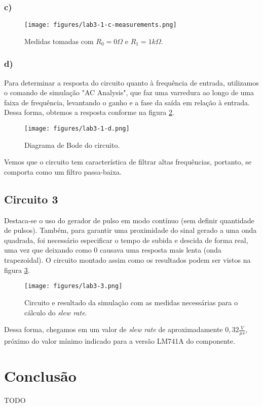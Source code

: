 \documentclass[a4paper]{report}
\begin{document}
\subsubsection*{c)}

\begin{figure}[H]
    \centering
    \texttt{[image: figures/lab3-1-c-measurements.png]}
    \caption{Medidas tomadas com $R_0=0 \Omega$ e $R_1 = 1 k\Omega$.}
    \label{fig:figures-lab3-1-a-measurements-png}
\end{figure}

\subsubsection*{d)}

Para determinar a resposta do circuito quanto à frequência de entrada, utilizamos o comando de simulação "AC Analysis", que faz uma varredura ao longo de uma faixa de frequência, levantando o ganho e a fase da saída em relação à entrada. Dessa forma, obtemos a resposta conforme na figura \ref{fig:figures-lab3-1-a-measurements-png}.

\begin{figure}[H]
    \centering
    \texttt{[image: figures/lab3-1-d.png]}
    \caption{Diagrama de Bode do circuito.}
    \label{fig:figures-lab3-1-a-measurements-png}
\end{figure}

Vemos que o circuito tem característica de filtrar altas frequências, portanto, se comporta como um filtro passa-baixa.

\subsection*{Circuito 3}

Destaca-se o uso do gerador de pulso em modo contínuo (sem definir quantidade de pulsos). Também, para garantir uma proximidade do sinal gerado a uma onda quadrada, foi necessário especificar o tempo de subida e descida de forma real, uma vez que deixando como 0 causava uma resposta mais lenta (onda trapezoidal). O circuito montado assim como os resultados podem ser vistos na figura \ref{fig:figures-lab3-3-png}.

\begin{figure}[H]
    \centering
    \texttt{[image: figures/lab3-3.png]}
    \caption{Circuito e resultado da simulação com as medidas necessárias para o cálculo do \emph{slew rate}.}
    \label{fig:figures-lab3-3-png}
\end{figure}

Dessa forma, chegamos em um valor de \emph{slew rate} de aproximadamente $0,32 \frac{V}{\mu s}$, próximo do valor mínimo indicado para a versão LM741A do componente.

\section*{Conclusão}

TODO
\end{document}
